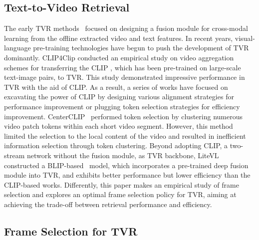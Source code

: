 \documentclass[11pt]{article}
\begin{document}
\subsection{Text-to-Video Retrieval}

The early TVR methods~\cite{yu2018joint, liu2019use, gabeur2020multi} focused on designing a fusion module for cross-modal learning from the offline extracted video and text features.
In recent years, visual-language pre-training technologies have begun to push the development of TVR dominantly.
CLIP4Clip \cite{luo2022clip4clip} conducted an empirical study on video aggregation schemes for transferring the CLIP \cite{radford2021learning}, which has been pre-trained on large-scale text-image pairs, to TVR. 
This study demonstrated impressive performance in TVR with the aid of CLIP.
As a result, a series of works have focused on excavating the power of CLIP by designing various alignment strategies \cite{ma2022x, fang2023uatvr, gorti2022x, chen2023tagging} for performance improvement or plugging token selection strategies \cite{zhao2022centerclip, liu2022ts2} for efficiency improvement.
CenterCLIP~\cite{zhao2022centerclip} performed token selection by clustering numerous video patch tokens within each short video segment. 
However, this method limited the selection to the local content of the video and resulted in inefficient information selection through token clustering.
Beyond adopting CLIP, a two-stream network without the fusion module, as TVR backbone, LiteVL~\cite{chen2022litevl} constructed a BLIP-based~\cite{li2022blip} model, which incorporates a pre-trained deep fusion module into TVR, and exhibits better performance but lower efficiency than the CLIP-based works.
Differently, this paper makes an empirical study of frame selection and explores an optimal frame selection policy for TVR, aiming at achieving the trade-off between retrieval performance and efficiency.

\subsection{Frame Selection for TVR}
\end{document}
